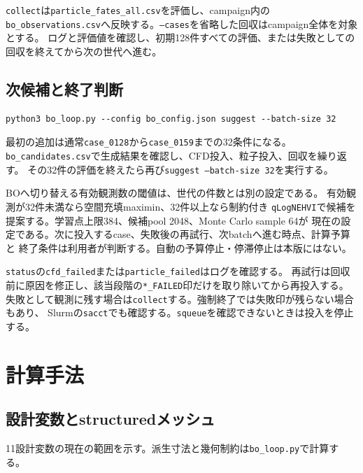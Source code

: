 \documentclass[a4paper,11pt]{article}
\newcommand{\code}[1]{\texttt{#1}}
\begin{document}
\code{collect}は\code{particle\_fates\_all.csv}を評価し、campaign内の
\code{bo\_observations.csv}へ反映する。\code{--cases}を省略した回収はcampaign全体を対象とする。
ログと評価値を確認し、初期128件すべての評価、または失敗としての回収を終えてから次の世代へ進む。

\subsection{次候補と終了判断}

\begin{verbatim}
python3 bo_loop.py --config bo_config.json suggest --batch-size 32
\end{verbatim}

最初の追加は通常\code{case\_0128}から\code{case\_0159}までの32条件になる。
\code{bo\_candidates.csv}で生成結果を確認し、CFD投入、粒子投入、回収を繰り返す。
その32件の評価を終えたら再び\code{suggest --batch-size 32}を実行する。

BOへ切り替える有効観測数の閾値は、世代の件数とは別の設定である。
有効観測が32件未満なら空間充填maximin、32件以上なら制約付き
\code{qLogNEHVI}で候補を提案する。学習点上限384、候補pool 2048、Monte Carlo sample 64が
現在の設定である。次に投入するcase、失敗後の再試行、次batchへ進む時点、計算予算と
終了条件は利用者が判断する。自動の予算停止・停滞停止は本版にはない。

\code{status}の\code{cfd\_failed}または\code{particle\_failed}はログを確認する。
再試行は回収前に原因を修正し、該当段階の\code{*\_FAILED}印だけを取り除いてから再投入する。
失敗として観測に残す場合は\code{collect}する。強制終了では失敗印が残らない場合もあり、
Slurmの\code{sacct}でも確認する。\code{squeue}を確認できないときは投入を停止する。

\section{計算手法}

\subsection{設計変数とstructuredメッシュ}

11設計変数の現在の範囲を示す。派生寸法と幾何制約は\code{bo\_loop.py}で計算する。
\end{document}
